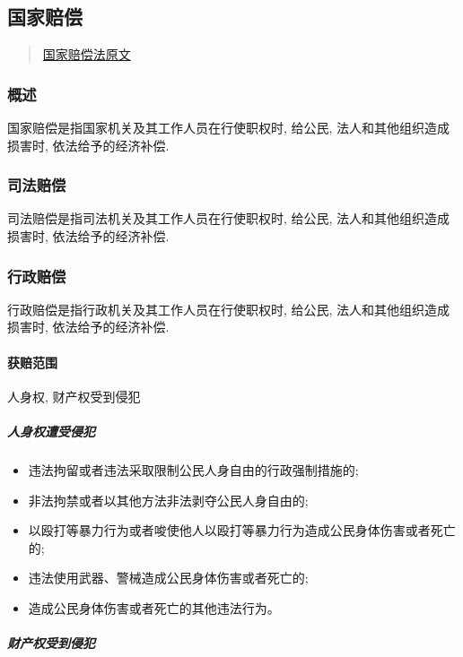 \subsection{国家赔偿}

\begin{quote}
	\href{https://www.gjxfj.gov.cn/gjxfj/xxgk/fgwj/flfg/webinfo/2016/03/1460585589927542.htm}{国家赔偿法原文}
\end{quote}

\subsubsection{概述}

国家赔偿是指国家机关及其工作人员在行使职权时, 给公民, 法人和其他组织造成损害时, 依法给予的经济补偿.

\subsubsection{司法赔偿}

司法赔偿是指司法机关及其工作人员在行使职权时, 给公民, 法人和其他组织造成损害时, 依法给予的经济补偿.

\subsubsection{行政赔偿}

行政赔偿是指行政机关及其工作人员在行使职权时, 给公民, 法人和其他组织造成损害时, 依法给予的经济补偿.

\paragraph{获赔范围} 人身权, 财产权受到侵犯

\subparagraph{人身权遭受侵犯}

\begin{itemize}
	\item 违法拘留或者违法采取限制公民人身自由的行政强制措施的;
	\item 非法拘禁或者以其他方法非法剥夺公民人身自由的;
	\item 以殴打等暴力行为或者唆使他人以殴打等暴力行为造成公民身体伤害或者死亡的;
	\item 违法使用武器、警械造成公民身体伤害或者死亡的;
	\item 造成公民身体伤害或者死亡的其他违法行为。
\end{itemize}

\subparagraph{财产权受到侵犯}


